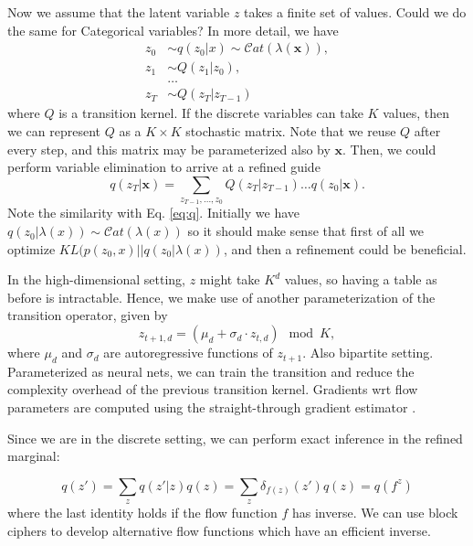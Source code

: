 \iffalse
Now we assume that the latent variable $z$ takes a finite set of values.
Could we do the same for Categorical variables?  In more detail, we have
\begin{align*}
z_0 &\sim q(z_0 | x) \sim \mathcal{C}at(\lambda(\bm{x})), \\
z_1 &\sim Q(z_1 | z_0), \\
&\ldots \\
z_{T} &\sim Q(z_T | z_{T-1})
\end{align*}
where $Q$ is a transition kernel. If the discrete variables can
take $K$ values, then we can represent $Q$ as a $K\times K$ stochastic
matrix. Note that we reuse $Q$ after every step, and this matrix 
may be parameterized also by $\bm{x}$. Then, we could perform variable elimination to arrive at a refined guide 
$$
q(z_T | \bm{x}) = \sum_{z_{T-1}, \ldots, z_0 } Q(z_T| z_{T-1}) \ldots q(z_0 | \bm{x}).
$$
Note the similarity with Eq. \ref{eq:q}. Initially we have $q(z_0| \lambda(x)) \sim \mathcal{C}at(\lambda(x))$ so it should make sense that first of all we optimize $KL(p(z_0, x) || q(z_0 | \lambda(x))$, and then a refinement could be beneficial.

In the high-dimensional setting, $z$ might take $K^d$ values, so having a table as before is intractable. Hence, we make use of another parameterization of the transition operator, given by
$$
z_{t+1,d} = (\mu_d + \sigma_d \cdot z_{t,d}) \mod K,
$$
where $\mu_d$ and $\sigma_d$ are autoregressive functions of $z_{t+1}$. Also bipartite setting. Parameterized as neural nets, we can train the transition and reduce the complexity overhead of the previous transition kernel. Gradients wrt flow parameters are computed using the straight-through gradient estimator \cite{bengio2013estimating}.

Since we are in the discrete setting, we can perform exact inference in the refined marginal:

$$
q(z') = \sum_{z} q(z'|z)q(z) = \sum_{z} \delta_{f(z)}(z') q(z) = q(f^{z})
$$
where the last identity holds if the flow function $f$ has inverse. We can use block ciphers to develop alternative flow functions which have an efficient inverse.

